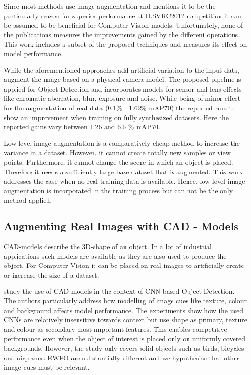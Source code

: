 Since most methods use image augmentation and \citeauthor{Krizhevsky2012a} \cite{Krizhevsky2012a} mentions it to be the particularly reason for superior performance at ILSVRC2012 competition it can be assumed to be beneficial for Computer Vision models. Unfortunately, none of the publications measures the improvements gained by the different operations. This work includes a subset of the proposed techniques and measures its effect on model performance.

While the aforementioned approaches add artificial variation to the input data, \citeauthor{Carlson2018}\cite{Carlson2018} augment the image based on a physical camera model. The proposed pipeline is applied for Object Detection and incorporates models for sensor and lens effects like chromatic aberration, blur, exposure and noise. While being of minor effect for the augmentation of real data (0.1\% - 1.62\% \ac{mAP}70) the reported results show an improvement when training on fully synthesized datasets. Here the reported gains vary between 1.26 and 6.5 \% \ac{mAP}70.

Low-level image augmentation is a comparatively cheap method to increase the variance in a dataset. However, it cannot create totally new samples or view points. Furthermore, it cannot change the scene in which an object is placed. Therefore it needs a sufficiently large base dataset that is augmented. This work addresses the case when no real training data is available. Hence, low-level image augmentation is incorporated in the training process but can not be the only method applied.

\subsection{Augmenting Real Images with CAD - Models}

\ac{CAD}-models describe the 3D-shape of an object. In a lot of industrial applications such models are available as they are also used to produce the object. For Computer Vision it can be placed on real images to artificially create or increase the size of a dataset. 

\citeauthor{Peng}\cite{Peng} study the use of \ac{CAD}-models in the context of \ac{CNN}-based Object Detection. The authors particularly address how modelling of image cues like texture, colour and background affects model performance. The experiments show how the used \acp{CNN} are relatively insensitive towards context but use shape as primary, texture and colour as secondary most important features. This enables competitive performance even when the object of interest is placed only on uniformly covered backgrounds. However, the study only covers solid objects such as birds, bicycles and airplanes. \ac{EWFO} are substantially different and we hypothesize that other image cues must be relevant.

